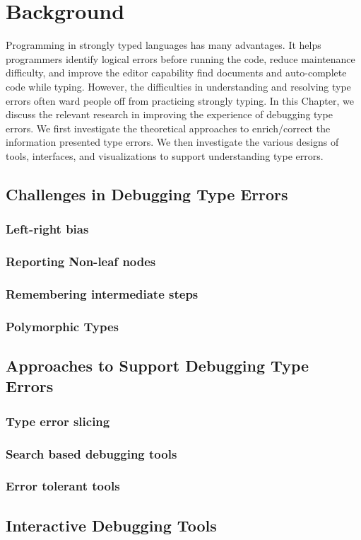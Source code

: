 


\chapter{Background}

Programming in strongly typed languages has many advantages. It helps programmers identify logical errors before running the code, reduce maintenance difficulty, and improve the editor capability find documents and auto-complete code while typing. However, the difficulties in understanding and resolving type errors often ward people off  from practicing strongly typing.  In this Chapter, we discuss the relevant research in improving the experience of debugging type errors. We first investigate the theoretical approaches to enrich/correct the information presented type errors. We then  investigate the various designs of tools, interfaces, and visualizations to support understanding type errors.

\label{chapter2} 




\section{Challenges in Debugging Type Errors}

\subsection{Left-right bias}

\subsection{Reporting Non-leaf nodes}

\subsection{Remembering intermediate steps}

\subsection{Polymorphic Types}

\section{Approaches to Support Debugging Type Errors}

\subsection{Type error slicing}

\subsection{Search based debugging tools}

\subsection{Error tolerant tools}

\section{Interactive Debugging Tools}

